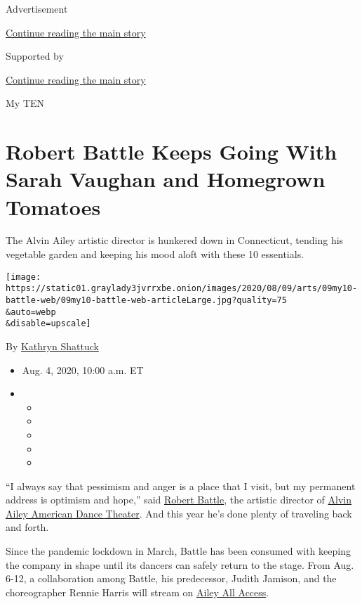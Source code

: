 Advertisement

\protect\hyperlink{after-top}{Continue reading the main story}

Supported by

\protect\hyperlink{after-sponsor}{Continue reading the main story}

My TEN

\hypertarget{robert-battle-keeps-going-with-sarah-vaughan-and-homegrown-tomatoes}{%
\section{Robert Battle Keeps Going With Sarah Vaughan and Homegrown
Tomatoes}\label{robert-battle-keeps-going-with-sarah-vaughan-and-homegrown-tomatoes}}

The Alvin Ailey artistic director is hunkered down in Connecticut,
tending his vegetable garden and keeping his mood aloft with these 10
essentials.

\texttt{[image: https://static01.graylady3jvrrxbe.onion/images/2020/08/09/arts/09my10-battle-web/09my10-battle-web-articleLarge.jpg?quality=75\\\&auto=webp\\\&disable=upscale]}

By \href{https://www.nytimes3xbfgragh.onion/by/kathryn-shattuck}{Kathryn
Shattuck}

\begin{itemize}
\item
  Aug. 4, 2020, 10:00 a.m. ET
\item
  \begin{itemize}
  \item
  \item
  \item
  \item
  \item
  \end{itemize}
\end{itemize}

``I always say that pessimism and anger is a place that I visit, but my
permanent address is optimism and hope,'' said
\href{https://www.alvinailey.org/alvin-ailey-american-dance-theater/robert-battle}{Robert
Battle}, the artistic director of
\href{https://www.alvinailey.org/}{Alvin Ailey American Dance Theater}.
And this year he's done plenty of traveling back and forth.

Since the pandemic lockdown in March, Battle has been consumed with
keeping the company in shape until its dancers can safely return to the
stage. From Aug. 6-12, a collaboration among Battle, his predecessor,
Judith Jamison, and the choreographer Rennie Harris will stream on
\href{https://www.alvinailey.org/performances-tickets/ailey-all-access}{Ailey
All Access}.

